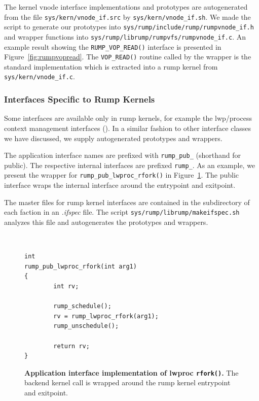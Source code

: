 The kernel vnode interface implementations and prototypes are
autogenerated from the file \verb+sys/kern/vnode_if.src+ by
\verb+sys/kern/vnode_if.sh+.
We made the script to generate our prototypes into
\verb+sys/rump/include/rump/rumpvnode_if.h+ and wrapper functions
into \verb+sys/rump/librump/rumpvfs/rumpvnode_if.c+.  An example
result showing the \verb+RUMP_VOP_READ()+ interface is presented in
Figure~\ref{fig:rumpvopread}.  The \verb+VOP_READ()+ routine called
by the wrapper is the standard implementation which is extracted
into a rump kernel from \verb+sys/kern/vnode_if.c+.


\subsubsection{Interfaces Specific to Rump Kernels}

Some interfaces are available only in rump kernels, for example the
lwp/process context management interfaces
().  In a similar fashion
to other interface classes we have discussed, we supply autogenerated
prototypes and wrappers.

The application interface names are prefixed with \verb+rump_pub_+
(shorthand for public).  The respective internal interfaces are
prefixed \verb+rump_+.  As an example, we present the wrapper for
\verb+rump_pub_lwproc_rfork()+ in Figure~\ref{fig:rumppubrfork}.
The public interface wraps the internal interface around the entrypoint
and exitpoint.

The master files for rump kernel interfaces are contained in the
subdirectory of each faction in an \textit{.ifspec} file.  The
script \texttt{sys/rump/librump/makeifspec.sh} analyzes this
file and autogenerates the prototypes and wrappers.

\begin{figure}[t]
{\tt \scriptsize  
\begin{verbatim}
int
rump_pub_lwproc_rfork(int arg1)
{
        int rv;

        rump_schedule();
        rv = rump_lwproc_rfork(arg1);
        rump_unschedule();

        return rv;
}
\end{verbatim}}
\caption[Application interface implementation of lwproc \texttt{rfork()}]{
\textbf{Application interface implementation of lwproc \texttt{rfork()}.}
The backend kernel call is wrapped around the rump kernel entrypoint
and exitpoint.
}
\label{fig:rumppubrfork}
\end{figure}

